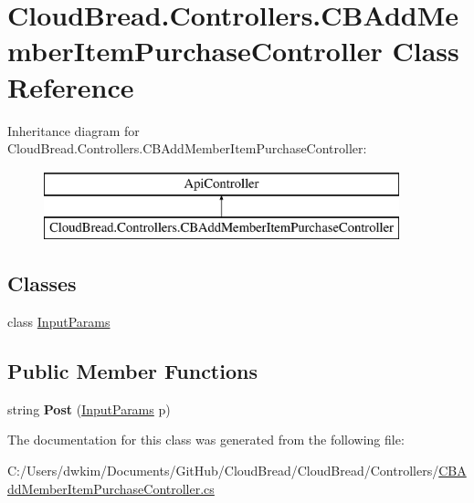 \hypertarget{a00023}{}\section{Cloud\+Bread.\+Controllers.\+C\+B\+Add\+Member\+Item\+Purchase\+Controller Class Reference}
\label{a00023}
Inheritance diagram for Cloud\+Bread.\+Controllers.\+C\+B\+Add\+Member\+Item\+Purchase\+Controller\+:\begin{figure}[H]
\begin{center}
\leavevmode
\includegraphics[height=2.000000cm]{a00023}
\end{center}
\end{figure}
\subsection*{Classes}
\begin{DoxyCompactItemize}
\item 
class \hyperlink{a00124}{Input\+Params}
\end{DoxyCompactItemize}
\subsection*{Public Member Functions}
\begin{DoxyCompactItemize}
\item 
string {\bfseries Post} (\hyperlink{a00124}{Input\+Params} p)\hypertarget{a00023_ae2853526a3a3167600fc4fb9e0e5d8f1}{}\label{a00023_ae2853526a3a3167600fc4fb9e0e5d8f1}

\end{DoxyCompactItemize}


The documentation for this class was generated from the following file\+:\begin{DoxyCompactItemize}
\item 
C\+:/\+Users/dwkim/\+Documents/\+Git\+Hub/\+Cloud\+Bread/\+Cloud\+Bread/\+Controllers/\hyperlink{a00198}{C\+B\+Add\+Member\+Item\+Purchase\+Controller.\+cs}\end{DoxyCompactItemize}
